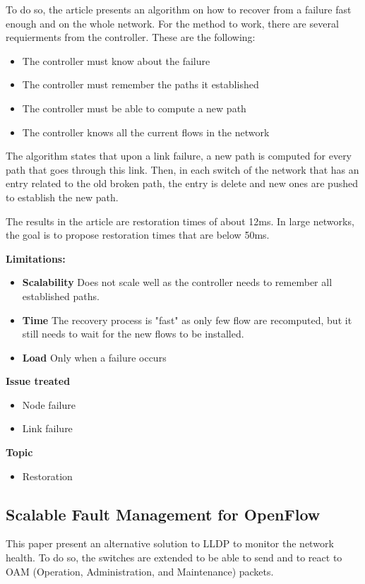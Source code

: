 \documentclass[compsoc]{IEEEtran}
\begin{document}
To do so, the article presents an algorithm on how to recover from a failure fast enough and on the whole network.
For the method to work, there are several requierments from the controller. These are the following:
\begin{itemize}
	\item The controller must know about the failure
	\item The controller must remember the paths it established
	\item The controller must be able to compute a new path
	\item The controller knows all the current flows in the network
\end{itemize}
The algorithm states that upon a link failure, a new path is computed for every path that goes through this link.
Then, in each switch of the network that has an entry related to the old broken path, the entry is delete and new ones are pushed to establish the new path.

The results in the article are restoration times of about 12ms. In large networks, the goal is to propose restoration times that are below 50ms.

\textbf{Limitations:}
\begin{itemize}
	\item \textbf{Scalability} Does not scale well as the controller needs to remember all established paths.
	\item \textbf{Time} The recovery process is "fast" as only few flow are recomputed, but it still needs to wait for the new flows to be installed.
	\item \textbf{Load} Only when a failure occurs
\end{itemize}

\textbf{Issue treated}
\begin{itemize}
	\item Node failure
	\item Link failure
\end{itemize}

\textbf{Topic}
\begin{itemize}
	\item Restoration
\end{itemize}

\subsection{Scalable Fault Management for OpenFlow \cite{6364688}}
This paper present an alternative solution to LLDP to monitor the network health. To do so, the switches are extended to be able to send and to react to OAM (Operation, Administration, and Maintenance) packets.
\end{document}
